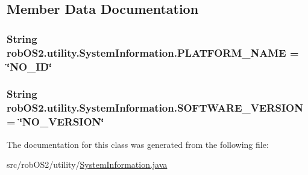 \subsection{Member Data Documentation}
\hypertarget{classrob_o_s2_1_1utility_1_1_system_information_a1cc5883fedf8c1378e2a7610c367ef06}{
\subsubsection[{PLATFORM\_\-NAME}]{\setlength{\rightskip}{0pt plus 5cm}String {\bf robOS2.utility.SystemInformation.PLATFORM\_\-NAME} = \char`\"{}NO\_\-ID\char`\"{}}}
\label{classrob_o_s2_1_1utility_1_1_system_information_a1cc5883fedf8c1378e2a7610c367ef06}
\hypertarget{classrob_o_s2_1_1utility_1_1_system_information_a76fe6989d850779270a2152b803368b5}{
\subsubsection[{SOFTWARE\_\-VERSION}]{\setlength{\rightskip}{0pt plus 5cm}String {\bf robOS2.utility.SystemInformation.SOFTWARE\_\-VERSION} = \char`\"{}NO\_\-VERSION\char`\"{}}}
\label{classrob_o_s2_1_1utility_1_1_system_information_a76fe6989d850779270a2152b803368b5}


The documentation for this class was generated from the following file:\begin{DoxyCompactItemize}
\item 
src/robOS2/utility/\hyperlink{_system_information_8java}{SystemInformation.java}\end{DoxyCompactItemize}
